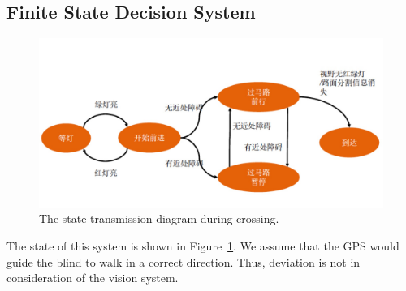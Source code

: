 


\subsection{Finite State Decision System}

\begin{figure}[t]
\begin{center}
 \includegraphics[width=1.\linewidth]{figure/fsm_state.jpeg}
\end{center}
   \caption{The state transmission diagram during crossing.}
\label{fig:fsm}
\end{figure}
The state of this system is shown in Figure~\ref{fig:fsm}. We assume that the GPS would guide the blind to walk in a correct direction. Thus, deviation is not in consideration of the vision system. 
